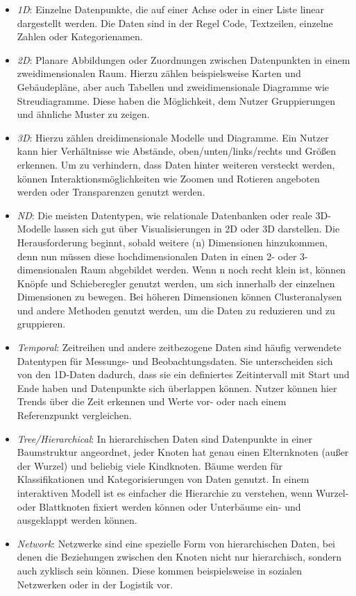 \begin{itemize}
    \item \emph{1D}:
    Einzelne Datenpunkte, die auf einer Achse oder in einer Liste linear dargestellt werden.
    Die Daten sind in der Regel Code, Textzeilen, einzelne Zahlen oder Kategorienamen.
    \item \emph{2D}:
    Planare Abbildungen oder Zuordnungen zwischen Datenpunkten in einem zweidimensionalen Raum.
    Hierzu zählen beispielsweise Karten und Gebäudepläne, aber auch Tabellen und zweidimensionale Diagramme wie Streudiagramme.
    Diese haben die Möglichkeit, dem Nutzer Gruppierungen und ähnliche Muster zu zeigen.
    \item \emph{3D}:
    Hierzu zählen dreidimensionale Modelle und Diagramme.
    Ein Nutzer kann hier Verhältnisse wie Abstände, oben/unten/links/rechts und Größen erkennen.
    Um zu verhindern, dass Daten hinter weiteren versteckt werden, können Interaktionsmöglichkeiten wie Zoomen und Rotieren angeboten werden oder Transparenzen genutzt werden.
    \item \emph{ND}:
    Die meisten Datentypen, wie relationale Datenbanken oder reale 3D-Modelle lassen sich gut über Visualisierungen in 2D oder 3D darstellen.
    Die Herausforderung beginnt, sobald weitere (n) Dimensionen hinzukommen, denn nun müssen diese hochdimensionalen Daten in einen 2- oder 3-dimensionalen Raum abgebildet werden.
    Wenn n noch recht klein ist, können Knöpfe und Schieberegler genutzt werden, um sich innerhalb der einzelnen Dimensionen zu bewegen.
    Bei höheren Dimensionen können Clusteranalysen und andere Methoden genutzt werden, um die Daten zu reduzieren und zu gruppieren.
    \item \emph{Temporal}:
    Zeitreihen und andere zeitbezogene Daten sind häufig verwendete Datentypen für Messungs- und Beobachtungsdaten.
    Sie unterscheiden sich von den 1D-Daten dadurch, dass sie ein definiertes Zeitintervall mit Start und Ende haben und Datenpunkte sich überlappen können.
    Nutzer können hier Trends über die Zeit erkennen und Werte vor- oder nach einem Referenzpunkt vergleichen.
    \item \emph{Tree/Hierarchical}:
    In hierarchischen Daten sind Datenpunkte in einer Baumstruktur angeordnet, jeder Knoten hat genau einen Elternknoten (außer der Wurzel) und beliebig viele Kindknoten.
    Bäume werden für Klassifikationen und Kategorisierungen von Daten genutzt.
    In einem interaktiven Modell ist es einfacher die Hierarchie zu verstehen, wenn Wurzel- oder Blattknoten fixiert werden können oder Unterbäume ein- und ausgeklappt werden können.
    \item \emph{Network}:
    Netzwerke sind eine spezielle Form von hierarchischen Daten, bei denen die Beziehungen zwischen den Knoten nicht nur hierarchisch, sondern auch zyklisch sein können.
    Diese kommen beispielsweise in sozialen Netzwerken oder in der Logistik vor.
\end{itemize}

